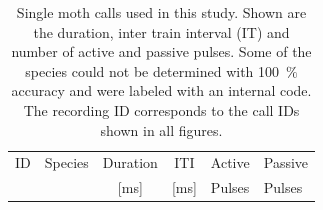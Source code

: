 \documentclass[12pt,a4paper,pdftex]{article}
\newcommand{\percent}[1]{#1~$\%$}
\begin{document}
\begin{table}[h]
	\centering
	\caption{Single moth calls used in this study. Shown are the duration, inter train interval (IT) and number of active and passive pulses. Some of the species could not be determined with \percent{100} accuracy and were labeled with an internal code. The recording ID corresponds to the call IDs shown in all figures.}
	\setlength{\tabcolsep}{6pt} %
	\renewcommand{\arraystretch}{1.5} %
	\label{tab:SC}
	\begin{tabular}{llcccc}
		\rowcolor[HTML]{EFEFEF} 
		ID & {\color[HTML]{000000} Species}     & \multicolumn{1}{c}{\cellcolor[HTML]{EFEFEF}Duration } & \multicolumn{1}{c}{\cellcolor[HTML]{EFEFEF}ITI} & \multicolumn{1}{l}{\cellcolor[HTML]{EFEFEF}Active} & \multicolumn{1}{l}{\cellcolor[HTML]{EFEFEF}Passive} \\
		\rowcolor[HTML]{EFEFEF}
		& & \multicolumn{1}{c}{\cellcolor[HTML]{EFEFEF}[ms]} & \multicolumn{1}{c}{\cellcolor[HTML]{EFEFEF}[ms]} & \multicolumn{1}{l}{\cellcolor[HTML]{EFEFEF}Pulses} &
		\multicolumn{1}{l}{\cellcolor[HTML]{EFEFEF}Pulses} \\ \hline
		

\end{tabular}
\end{table}
\end{document}
